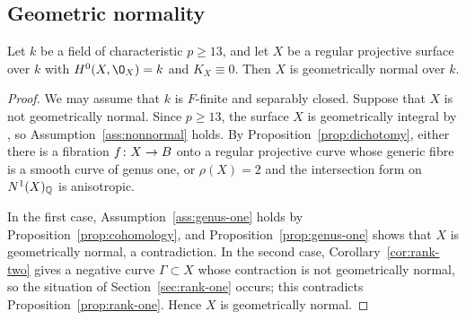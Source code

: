 \subsection{Geometric normality}\label{sec:completion}

\begin{theorem}\label{thm:geometric-normality}
Let $k$ be a field of characteristic $p\geq 13$, and let $X$ be a regular projective surface over $k$ with $H^0(X,\O_X) = k$ and $K_X\equiv 0$.
Then $X$ is geometrically normal over $k$.
\end{theorem}

\begin{proof}
We may assume that $k$ is $F$-finite and separably closed.
Suppose that $X$ is not geometrically normal.
Since $p\geq 13$, the surface $X$ is geometrically integral by \cite[Theorem~1.2]{WZ26}, so Assumption~\ref{ass:nonnormal} holds.
By Proposition~\ref{prop:dichotomy}, either there is a fibration $f\colon X\to B$ onto a regular projective curve whose generic fibre is a smooth curve of genus one, or $\rho(X) = 2$ and the intersection form on $N^1(X)_{\mathbb{Q}}$ is anisotropic.

In the first case, Assumption~\ref{ass:genus-one} holds by Proposition~\ref{prop:cohomology}, and Proposition~\ref{prop:genus-one} shows that $X$ is geometrically normal, a contradiction.
In the second case, Corollary~\ref{cor:rank-two} gives a negative curve $\Gamma\subset X$ whose contraction is not geometrically normal, so the situation of Section~\ref{sec:rank-one} occurs; this contradicts Proposition~\ref{prop:rank-one}.
Hence $X$ is geometrically normal.
\end{proof}

